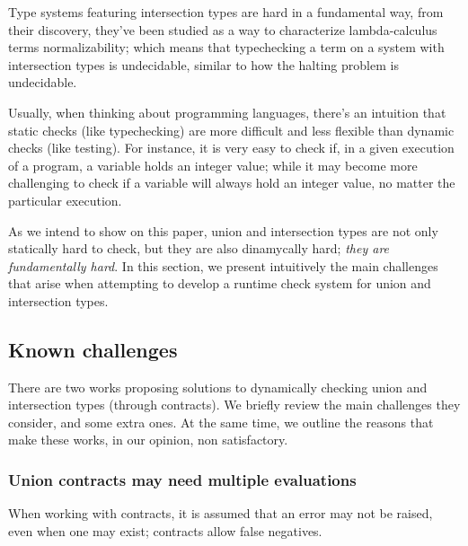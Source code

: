 \newcommand{\moral}[1]{\noindent $\hookrightarrow$ \textsc{#1}}

Type systems featuring intersection types are hard in a fundamental way,
from their discovery, they've been studied as a way to characterize
lambda-calculus terms normalizability; which means that typechecking a
term on a system with intersection types is undecidable,
similar to how the halting problem is undecidable.

Usually, when thinking about programming languages, there's an intuition
that static checks (like typechecking) are more difficult and less flexible
than dynamic checks (like testing). For instance, it is very easy to check if,
in a given execution of a program, a variable holds an integer value; while it
may become more challenging to check if a variable will always hold an integer value,
no matter the particular execution.

As we intend to show on this paper, union and intersection types are not only
statically hard to check, but they are also dinamycally hard;
\emph{they are fundamentally hard}.
In this section, we present intuitively the main challenges that arise
when attempting to develop a runtime check system for union and intersection types.

\subsection{Known challenges}

There are two works proposing solutions to dynamically checking union and intersection
types (through contracts). 
We briefly review the main challenges they consider, and some extra ones.
At the same time, we outline the reasons that make these works,
in our opinion, non satisfactory.


\subsubsection*{Union contracts may need multiple evaluations}

When working with contracts, it is assumed that an error may not be raised, even
when one may exist; contracts allow false negatives.


